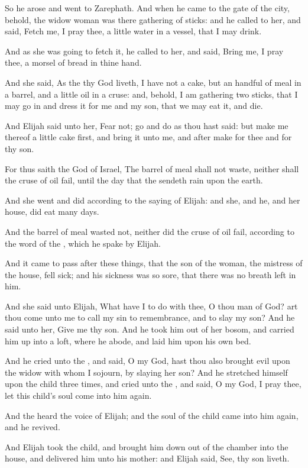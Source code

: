 \verse So he arose and went to Zarephath. And when he came to the gate of the city, behold, the widow woman was there gathering of sticks: and he called to her, and said, Fetch me, I pray thee, a little water in a vessel, that I may drink.

\verse And as she was going to fetch it, he called to her, and said, Bring me, I pray thee, a morsel of bread in thine hand.

\verse And she said, As the \LORD thy God liveth, I have not a cake, but an handful of meal in a barrel, and a little oil in a cruse: and, behold, I am gathering two sticks, that I may go in and dress it for me and my son, that we may eat it, and die.

\verse And Elijah said unto her, Fear not; go and do as thou hast said: but make me thereof a little cake first, and bring it unto me, and after make for thee and for thy son.

\verse For thus saith the \LORD God of Israel, The barrel of meal shall not waste, neither shall the cruse of oil fail, until the day that the \LORD sendeth rain upon the earth.

\verse And she went and did according to the saying of Elijah: and she, and he, and her house, did eat many days.

\verse And the barrel of meal wasted not, neither did the cruse of oil fail, according to the word of the \LORD, which he spake by Elijah.

\verse And it came to pass after these things, that the son of the woman, the mistress of the house, fell sick; and his sickness was so sore, that there was no breath left in him.

\verse And she said unto Elijah, What have I to do with thee, O thou man of God? art thou come unto me to call my sin to remembrance, and to slay my son?  \verse And he said unto her, Give me thy son. And he took him out of her bosom, and carried him up into a loft, where he abode, and laid him upon his own bed.

\verse And he cried unto the \LORD, and said, O \LORD my God, hast thou also brought evil upon the widow with whom I sojourn, by slaying her son?  \verse And he stretched himself upon the child three times, and cried unto the \LORD, and said, O \LORD my God, I pray thee, let this child's soul come into him again.

\verse And the \LORD heard the voice of Elijah; and the soul of the child came into him again, and he revived.

\verse And Elijah took the child, and brought him down out of the chamber into the house, and delivered him unto his mother: and Elijah said, See, thy son liveth.


